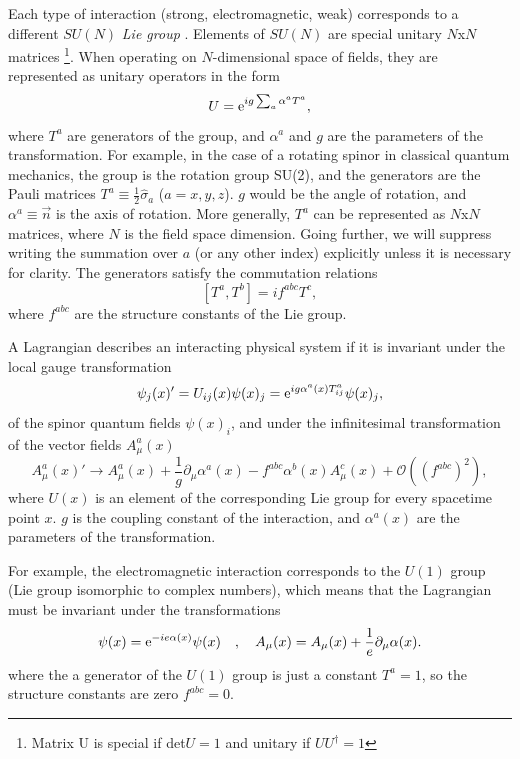 Each type of interaction (strong, electromagnetic, weak) corresponds to a different $SU(N)$ \emph{Lie group} \cite{fecko}.
Elements of $SU(N)$ are special unitary $N$x$N$ matrices \footnote{Matrix U is special if det$U=1$ and unitary if $UU^{\dagger} = 1$}. 
When operating on $N$-dimensional space of fields, they are represented as unitary operators in the form 
\begin{equation}
    \label{eq:lie_element}
    U = \mathrm{e}^{i g \sum_{a} \alpha^a T^a},
\end{equation}
where $T^a$ are generators of the group, and $\alpha^a$ and $g$  are the parameters of the transformation.
For example, in the case of a rotating spinor in classical quantum mechanics, the group is the rotation group SU(2), and the generators are the Pauli matrices $T^a \equiv \frac12 \hat{\sigma}_a$ ($a = x,y,z$).
$g$ would be the angle of rotation, and $\alpha^a \equiv \vec{n}$ is the axis of rotation.
More generally, $T^a$ can be represented as $N$x$N$ matrices, where $N$ is the field space dimension.
Going further, we will suppress writing the summation over $a$ (or any other index) explicitly unless it is necessary for clarity.
The generators satisfy the commutation relations
\begin{equation}
    \label{eq:commutation}
    [T^a, T^b] = i f^{abc} T^c,
\end{equation}
where $f^{abc}$ are the structure constants of the Lie group.

A Lagrangian describes an interacting physical system if it is invariant under the local gauge transformation
\begin{equation}
    \label{eq:}
    \psi_j(x)' = U_{ij}(x)\psi(x)_j = \mathrm{e}^{i g \alpha^a(x) T^a_{ij}} \psi(x)_j,
\end{equation}
of the spinor quantum fields $\psi(x)_i$, and under the infinitesimal transformation of the vector fields $A^a_\mu(x)$
\begin{equation}
    \label{eq:gauge_inv_bosons}
    A^a_\mu(x)' \rightarrow A^a_\mu(x) + \frac{1}{g} \partial_\mu \alpha^a(x) - f^{abc} \alpha^b(x) A^c_\mu(x) + \mathcal{O}((f^{abc})^2),
\end{equation}
where $U(x)$ is an element of the corresponding Lie group for every spacetime point $x$.
$g$ is the coupling constant of the interaction, and $\alpha^a(x)$ are the parameters of the transformation.


For example, the electromagnetic interaction corresponds to the $U(1)$ group (Lie group isomorphic to complex numbers), which means that the Lagrangian must be invariant under the transformations
\begin{equation}
    \label{eq:gauge_inv_QED}
    \psi(x) = \mathrm{e}^{-i e \alpha(x)}\psi(x) \quad, \quad A_\mu(x) = A_\mu(x) + \frac{1}{e} \partial_\mu \alpha(x).
\end{equation}
where the a generator of the $U(1)$ group is just a constant $T^a = 1$, so the structure constants are zero $f^{abc} = 0$.

